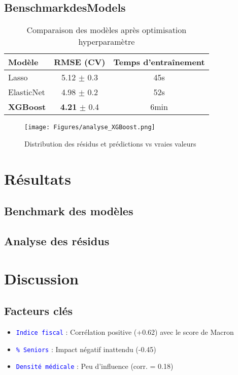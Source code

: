 \subsection{BenschmarkdesModels}

\begin{table}[ht!]
    \centering
    \begin{tabular}{@{}lcc@{}}
        \toprule
        Modèle & RMSE (CV) & Temps d'entraînement \\
        \midrule
        Lasso & 5.12 $\pm$ 0.3 & 45s \\
        ElasticNet & 4.98 $\pm$ 0.2 & 52s \\
        \textbf{XGBoost} & \textbf{4.21} $\pm$ 0.4 & 6min \\
        \bottomrule
    \end{tabular}
    \caption{Comparaison des modèles après optimisation hyperparamètre}
    \label{tab:perf}
\end{table}



\begin{figure}[ht!]
    \centering
    \texttt{[image: Figures/analyse\_XGBoost.png]}
    \caption{Distribution des résidus et prédictions vs vraies valeurs}
    \label{fig:residus}
\end{figure}











\section{Résultats}
\subsection{Benchmark des modèles}
\subsection{Analyse des résidus}

\section{Discussion}
\subsection{Facteurs clés}
\begin{itemize}
    \item \textcolor{blue}{\texttt{Indice fiscal}} : Corrélation positive (+0.62) avec le score de Macron
    \item \textcolor{blue}{\texttt{\% Seniors}} : Impact négatif inattendu (-0.45)
    \item \textcolor{blue}{\texttt{Densité médicale}} : Peu d'influence (corr. = 0.18)
\end{itemize}

